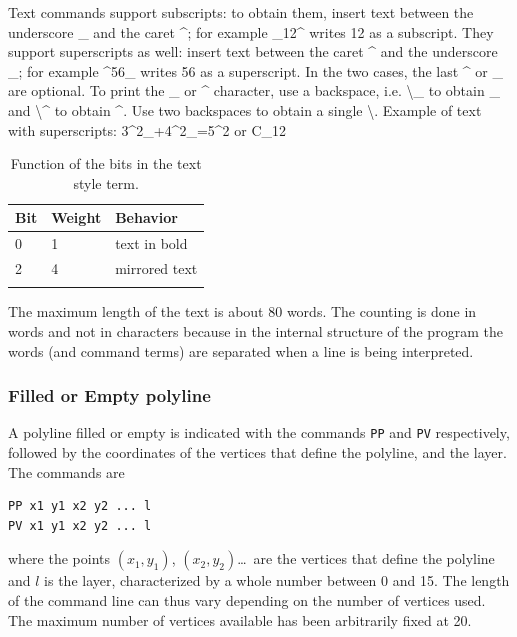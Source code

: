 \documentclass[10pt,a4paper,twoside]{scrreprt}
\newcommand{\toprule}{\hline}
\newcommand{\midrule}{\hline}
\newcommand{\bottomrule}{\hline}
\begin{document}
Text commands support subscripts: to obtain them, insert text between the underscore \_ and the caret \^{}; for example \_12\^{} writes 12 as a subscript. They support superscripts as well: insert text between the caret \^{} and the underscore \_; for example \^{}56\_ writes 56 as a superscript. In the two cases, the last \^{} or \_ are optional. To print the \_ or \^{} character, use a backspace, i.e. \textbackslash \_ to obtain \_ and \textbackslash \^{} to obtain \^{}. Use two backspaces to obtain a single \textbackslash. Example of text with superscripts: 3\^{}2\_+4\^{}2\_=5\^{}2 or C\_12


\begin{table}
\centering \begin{tabular}{llp{}}
\toprule Bit  & Weight  & Behavior \tabularnewline
\midrule 0  & 1  & text in bold\tabularnewline
2  & 4  & mirrored text\tabularnewline
\bottomrule  &  & \tabularnewline
\end{tabular}

\caption{Function of the bits in the text style term.}


\label{tab_stile_testo}
\end{table}


The maximum length of the text is about
80 words. The counting is done in words and not in characters because
in the internal structure of the program the words (and command terms)
are separated when a line is being interpreted.


\subsubsection{Filled or Empty polyline}

A polyline filled or empty is indicated with the
commands \lstinline!PP! and \lstinline!PV!
respectively, followed by the coordinates of the vertices that define
the polyline, and the layer. The commands are
\begin{lstlisting}
PP x1 y1 x2 y2 ... l
PV x1 y1 x2 y2 ... l
\end{lstlisting}
where the points $(x_{1},y_{1})$, $(x_{2},y_{2})$\dots\ are the vertices
that define the polyline and $l$ is the layer, characterized by a
whole number between 0 and 15. The length of the command line can
thus vary depending on the number of vertices used. The maximum number
of vertices available has been
arbitrarily fixed at 20.
\end{document}
